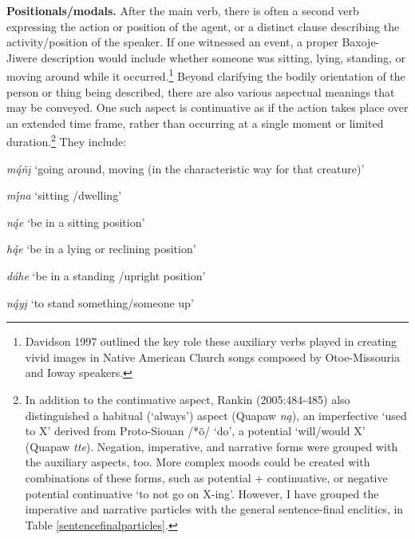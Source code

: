 \documentclass[output=paper]{LSP/langsci}
\begin{document}
\vspace{1em}
\textbf{Positionals/modals.}  After the main verb, there is often a second verb expressing the action or position of the agent, or a distinct clause describing the activity/position of the speaker.  If one witnessed an event, a proper Baxoje-Jiwere description would include whether someone was sitting, lying, standing, or moving around while it occurred.\footnote{Davidson 1997 outlined the key role these auxiliary verbs played in creating vivid images in Native American Church songs composed by Otoe-Missouria and Ioway speakers.}  Beyond clarifying the bodily orientation of the person or thing being described, there are also various aspectual meanings that may be conveyed.  One such aspect is continuative as if the action takes place over an extended time frame, rather than occurring at a single moment or limited duration.\footnote{In addition to the continuative aspect, Rankin (2005:484-485) also distinguished a habitual (`always') aspect (Quapaw \textit{n\k{a}}), an imperfective `used to X' derived from Proto-Siouan /*\~o/ `do', a potential `will/would X' (Quapaw \textit{tte}). Negation, imperative, and narrative forms were grouped with the auxiliary aspects, too. More complex moods could be created with combinations of these forms, such as potential + continuative, or negative potential continuative `to not go on X-ing'. However, I have grouped the imperative and narrative particles with the general sentence-final enclitics, in Table \ref{sentencefinalparticles}.} They include:

\hspace{2em} \textit{m\k{\'a}\~n\k{i}} `going around, moving (in the characteristic way for that creature)'
	
\hspace{2em} \textit{m\k{\'i}na}  `sitting /dwelling'

\hspace{2em} \textit{n\k{\'a}e} `be in a sitting position'

\hspace{2em} \textit{h\k{\'a}e}  `be in a lying or reclining position'

\hspace{2em} \textit{d\'ahe}  `be in a standing /upright position'

\hspace{2em} \textit{n\k{\'a}y\k{i}}   `to stand something/someone up'
\end{document}
